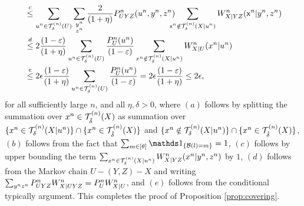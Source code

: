 \begin{align*}
&\overset{c}{\leq}\sum_{\substack{u^n \in \mathcal{T}_\delta^{(n)}(U) }}\sum_{\substack{y^n \\ z^n}}  
\frac{2}{(1+\eta)}  P_{UYZ}^n(u^n,y^n,z^n) \!\!\!\!\! \sum_{\substack{\mathsf{x}^n \notin \mathcal{T}_\delta^{(n)}(X|u^n)}}W^n_{X|YZ}(\mathsf{x}^n|y^n,z^n)\\
&\overset{d}{\leq}
 2\frac{(1-\varepsilon)}{(1+\eta)} \sum_{u^n \in \mathcal{T}_\delta^{(n)}(U)} \frac{P_{U}^n(u^n)}{(1-\varepsilon)} \sum_{x^n \notin\mathcal{T}_\delta^{(n)}(X|u^n)}W^n_{X|U}(x^n|u^n)\\
 &\overset{e}{\leq}
 2\epsilon \frac{(1-\varepsilon)}{(1+\eta)} \sum_{u^n \in \mathcal{T}_\delta^{(n)}(U)} \frac{P_{U}^n(u^n)}{(1-\varepsilon)} = 2\epsilon \frac{(1-\varepsilon)}{(1+\eta)} \leq 2\epsilon,
    \end{align*}
  for all sufficiently large $n$, and all $\eta,\delta > 0$, where $(a)$ follows by splitting the summation over $x^n \in \mathcal{T}_{\hat{\delta}}^{(n)}({X})$ as summation over $\{x^n \in \mathcal{T}_\delta^{(n)}(X|u^n)\} \cap \{x^n \in \mathcal{T}_{\hat{\delta}}^{(n)}({X})\}$ and $\{x^n \notin \mathcal{T}_\delta^{(n)}(X|u^n)\} \cap \{x^n \in \mathcal{T}_{\hat{\delta}}^{(n)}({X})\}$, $(b)$ follows from the fact that $\sum_{m \in [\theta]} \I_{\set{\calB(l) = m}} = 1$, $(c)$ follows by upper bounding the term $\sum_{x^n \in \mathcal{T}_\delta^{(n)}(X|u^n)} W^n_{X|YZ}(x^n|y^n,z^n)$ by $1$, $(d)$ follows from the Markov chain $U - (Y,Z) - X$ and writing $\sum_{y^nz^n} P_{UYZ}^n W^n_{X|UYZ} = P^n_U W^n_{X|U}$, and $(e)$ follows from the conditional typically argument. This completes the proof of Proposition \ref{prop:covering}.

